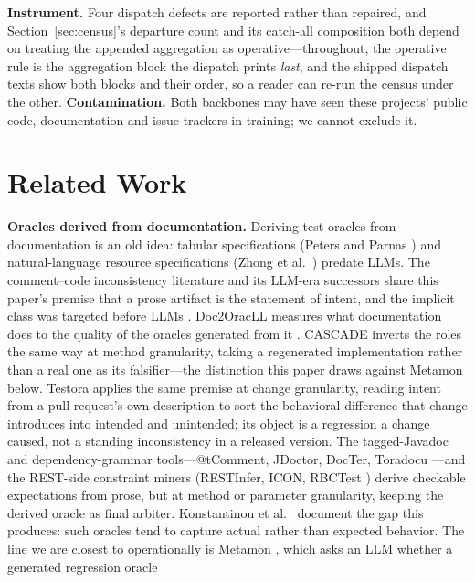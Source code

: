 \documentclass[acmsmall,screen,review,anonymous]{acmart}
\begin{document}
\textbf{Instrument.} Four dispatch defects are reported rather than repaired, and
Section~\ref{sec:census}'s departure count and its catch-all composition both depend on treating the
appended aggregation as operative---throughout, the operative rule is the aggregation block the
dispatch prints \emph{last}, and the shipped dispatch texts show both blocks and their order, so a
reader can re-run the census under the other. \textbf{Contamination.} Both backbones may have seen these
projects' public code, documentation and issue trackers in training; we cannot exclude it.

\section{Related Work}
\label{sec:related}

\textbf{Oracles derived from documentation.} Deriving test oracles from documentation is an old
idea: tabular specifications (Peters and Parnas \cite{peters98}) and natural-language resource
specifications (Zhong et al.\ \cite{zhong09}) predate LLMs. The comment--code inconsistency
literature \cite{icomment07,docref13} and its LLM-era successors
\cite{docchecker24,c4rllama25,docprism25} share this paper's premise that a prose artifact is the
statement of intent, and the implicit class was targeted before LLMs \cite{sondhi19implicit}.
Doc2OracLL measures what documentation does to the quality of the oracles generated from it
\cite{doc2oracll25}. CASCADE \cite{cascade26} inverts the roles the same way at method granularity,
taking a regenerated implementation rather than a real one as its falsifier---the distinction this
paper draws against Metamon below. Testora \cite{testora26} applies
the same premise at change granularity, reading intent from a pull request's own description to sort
the behavioral difference that change introduces into intended and unintended; its object is a
regression a change caused, not a standing inconsistency in a released version. The tagged-Javadoc and
dependency-grammar tools---@tComment, JDoctor, DocTer, Toradocu
\cite{tcomment12,jdoctor18,docter22,toradocu16}---and the REST-side constraint miners (RESTInfer,
ICON, RBCTest \cite{restinfer22,icon16,rbctest26}) derive checkable expectations from prose, but at
method or parameter granularity, keeping the derived oracle as final arbiter. Konstantinou et al.\
\cite{konstantinou24} document the gap this produces:
such oracles tend to capture actual rather than expected behavior. The line we are closest to
operationally is Metamon \cite{metamon25}, which asks an LLM whether a generated regression oracle
\end{document}

